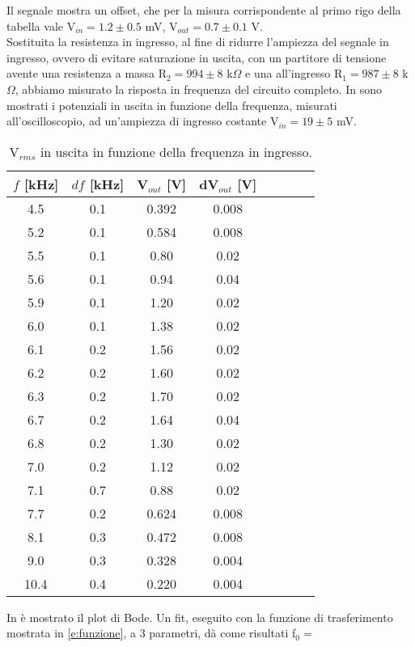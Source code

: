 Il segnale mostra un offset, che per la misura corrispondente al primo rigo della tabella vale V$_{in} = 1.2 \pm 0.5$ mV, V$_{out} = 0.7 \pm 0.1$ V.\\ %
Sostituita la resistenza in ingresso, al fine di ridurre l'ampiezza del segnale in ingresso, ovvero di evitare saturazione in uscita, con un partitore di tensione avente una resistenza a massa R$_2 = 994 \pm 8$ k$\Omega$ e una all'ingresso R$_1 = 987 \pm 8$ k$\Omega$, abbiamo misurato la risposta in frequenza del circuito completo. In  sono mostrati i potenziali in uscita in funzione della frequenza, misurati all'oscilloscopio, ad un'ampiezza di ingresso costante V$_{in} = 19 \pm 5$ mV.\\
\begin{table}[h]
	\centering
	\begin{tabular}{cccccccc}		
		 {$f$ [kHz]}& {$df$ [kHz]}& {V$_{out}$ [V]} & {dV$_{out}$ [V]}\\
		 \midrule
                      4.5 & 0.1 & 0.392 & 0.008\\
                      5.2 & 0.1 & 0.584 & 0.008\\
                      5.5 & 0.1 & 0.80 &	0.02\\
                      5.6 & 0.1 & 0.94 & 0.04\\
                      5.9 & 0.1 & 1.20 & 0.02\\
                      6.0 & 0.1 & 1.38 & 0.02\\
                      6.1 & 0.2 & 1.56 & 0.02\\
                      6.2 & 0.2 & 1.60 & 0.02\\
                      6.3 & 0.2 & 1.70 & 0.02\\
                      6.7 & 0.2 & 1.64 & 0.04\\
                      6.8 & 0.2 & 1.30 & 0.02\\	
                      7.0 & 0.2 & 1.12 & 0.02\\
                      7.1 & 0.7 & 0.88 & 0.02\\
                      7.7 & 0.2 & 0.624 & 0.008\\
                      8.1 & 0.3 & 0.472 & 0.008\\
                      9.0 & 0.3 & 0.328 & 0.004\\
                      10.4 & 0.4 & 0.220 & 0.004\\
 	\end{tabular}
	\caption{V$_{rms}$ in uscita in funzione della frequenza in ingresso.}
	\label{t:frequenza}
\end{table}
In  è mostrato il plot di Bode. Un fit, eseguito con la funzione di trasferimento mostrata in \ref{e:funzione}, a 3 parametri, dà come risultati f$_0 =$  \\



